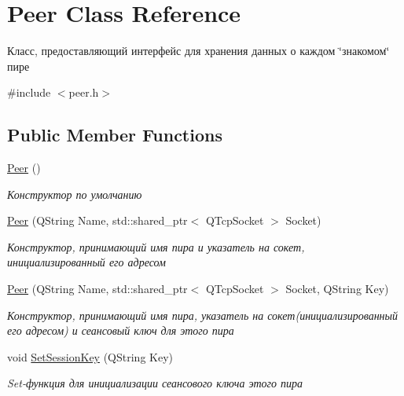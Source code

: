 \hypertarget{class_peer}{}\section{Peer Class Reference}
\label{class_peer}


Класс, предоставляющий интерфейс для хранения данных о каждом \char`\"{}знакомом\char`\"{} пире  




{\ttfamily \#include $<$peer.\+h$>$}

\subsection*{Public Member Functions}
\begin{DoxyCompactItemize}
\item 
\hyperlink{class_peer_a9649fd34528cb532cded43d84a163371}{Peer} ()
\begin{DoxyCompactList}\small\item\em Конструктор по умолчанию \end{DoxyCompactList}\item 
\hyperlink{class_peer_ace891b7f4130166ef1a15e2f5f6698f6}{Peer} (Q\+String Name, std\+::shared\+\_\+ptr$<$ Q\+Tcp\+Socket $>$ Socket)
\begin{DoxyCompactList}\small\item\em Конструктор, принимающий имя пира и указатель на сокет, инициализированный его адресом \end{DoxyCompactList}\item 
\hyperlink{class_peer_aa72ba8fe59c6d161a87e398b40dd7f61}{Peer} (Q\+String Name, std\+::shared\+\_\+ptr$<$ Q\+Tcp\+Socket $>$ Socket, Q\+String Key)
\begin{DoxyCompactList}\small\item\em Конструктор, принимающий имя пира, указатель на сокет(инициализированный его адресом) и сеансовый ключ для этого пира \end{DoxyCompactList}\item 
void \hyperlink{class_peer_a761fedbe29868c9c3fb3b2c0f337b18b}{Set\+Session\+Key} (Q\+String Key)
\begin{DoxyCompactList}\small\item\em Set-\/функция для инициализации сеансового ключа этого пира \end{DoxyCompactList}\end{DoxyCompactItemize}
